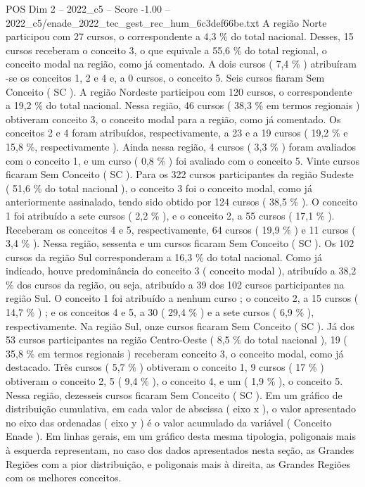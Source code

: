 \begin{textsample}{POS Dim 2 – 2022\_c5 – Score -1.00 – 2022\_c5/enade\_2022\_tec\_gest\_rec\_hum\_6c3def66be.txt}
A região Norte participou com 27 cursos, o correspondente a 4,3 \% do total nacional.
Desses, 15 cursos receberam o conceito 3, o que equivale a 55,6 \% do total regional, o conceito modal na região, como já comentado.
A dois cursos ( 7,4 \% ) atribuíram -se os conceitos 1, 2 e 4 e, a 0 cursos, o conceito 5.
Seis cursos fiaram Sem Conceito ( SC ).
A região Nordeste participou com 120 cursos, o correspondente a 19,2 \% do total nacional.
Nessa região, 46 cursos ( 38,3 \% em termos regionais ) obtiveram conceito 3, o conceito modal para a região, como já comentado.
Os conceitos 2 e 4 foram atribuídos, respectivamente, a 23 e a 19 cursos ( 19,2 \% e 15,8 \%, respectivamente ).
Ainda nessa região, 4 cursos ( 3,3 \% ) foram avaliados com o conceito 1, e um curso ( 0,8 \% ) foi avaliado com o conceito 5.
Vinte cursos ficaram Sem Conceito ( SC ).
Para os 322 cursos participantes da região Sudeste ( 51,6 \% do total nacional ), o conceito 3 foi o conceito modal, como já anteriormente assinalado, tendo sido obtido por 124 cursos ( 38,5 \% ).
O conceito 1 foi atribuído a sete cursos ( 2,2 \% ), e o conceito 2, a 55 cursos ( 17,1 \% ).
Receberam os conceitos 4 e 5, respectivamente, 64 cursos ( 19,9 \% ) e 11 cursos ( 3,4 \% ).
Nessa região, sessenta e um cursos ficaram Sem Conceito ( SC ).
Os 102 cursos da região Sul corresponderam a 16,3 \% do total nacional.
Como já indicado, houve predominância do conceito 3 ( conceito modal ), atribuído a 38,2 \% dos cursos da região, ou seja, atribuído a 39 dos 102 cursos participantes na região Sul.
O conceito 1 foi atribuído a nenhum curso ; o conceito 2, a 15 cursos ( 14,7 \% ) ; e os conceitos 4 e 5, a 30 ( 29,4 \% ) e a sete cursos ( 6,9 \% ), respectivamente.
Na região Sul, onze cursos ficaram Sem Conceito ( SC ).
Já dos 53 cursos participantes na região Centro-Oeste ( 8,5 \% do total nacional ), 19 ( 35,8 \% em termos regionais ) receberam conceito 3, o conceito modal, como já destacado.
Três cursos ( 5,7 \% ) obtiveram o conceito 1, 9 cursos ( 17 \% ) obtiveram o conceito 2, 5 ( 9,4 \% ), o conceito 4, e um ( 1,9 \% ), o conceito 5.
Nessa região, dezesseis cursos ficaram Sem Conceito ( SC ).
Em um gráfico de distribuição cumulativa, em cada valor de abscissa ( eixo x ), o valor apresentado no eixo das ordenadas ( eixo y ) é o valor acumulado da variável ( Conceito Enade ).
Em linhas gerais, em um gráfico desta mesma tipologia, poligonais mais à esquerda representam, no caso dos dados apresentados nesta seção, as Grandes Regiões com a pior distribuição, e poligonais mais à direita, as Grandes Regiões com os melhores conceitos.

\end{textsample}
